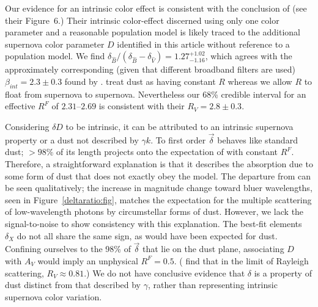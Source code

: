 \documentclass{aastex61}   	%
\begin{document}
Our evidence for an intrinsic color effect is consistent with the conclusion of   (see their Figure~6.)
Their intrinsic color-effect discerned using only one color parameter and a reasonable population model
is likely traced to the additional supernova
color parameter $D$ identified in this article without reference to a population model.
We find $\delta_{\hat{B}}/(\delta_{\hat{B}}-\delta_{\hat{V}})=1.27^{ + 1.02}_{ - 1.16}$, which agrees with the  approximately corresponding (given that different broadband
filters are used) $\beta_{\mathit{int}}=2.3\pm 0.3$ found by .
 treat dust as having constant $R$ whereas we allow $R$ to float 
from supernova to supernova.  Nevertheless our 68\% credible interval for an
effective $R^F$ of $2.31$--$2.69$ is consistent with their $R_V=2.8 \pm 0.3$.


Considering  $\delta D$  to be intrinsic, it can be attributed to an intrinsic supernova property  or a dust not described by $\gamma k$.
To first order $\vec{\delta}$ behaves like standard dust;   $>98$\% of its length projects onto the expectation of  
with constant $R^F$.
Therefore, a straightforward explanation is that it describes the absorption due to some form of dust
that does not exactly obey the   model.
The departure from   
can be seen qualitatively; the increase in magnitude change toward bluer wavelengths, seen in Figure~\ref{deltaratio:fig}, matches the 
expectation for the multiple scattering of low-wavelength photons by circumstellar forms of dust.
However, we
lack the signal-to-noise to show consistency with this explanation.
The best-fit elements $\delta_X$ do not all share the same sign, as would have been expected for dust.
Confining ourselves to the 98\% of   $\vec{\delta}$ that lie on the dust plane, associating 
$D$ with $A_V$ would imply an unphysical $R^F=0.5$.
(\citealt{Huang2017} find that in the limit of Rayleigh scattering, $R_V \approx 0.81$.)
We do not have conclusive evidence that  $\delta$ is a property of dust distinct from that described by $\gamma$, rather
than representing intrinsic supernova color variation.
\end{document}

